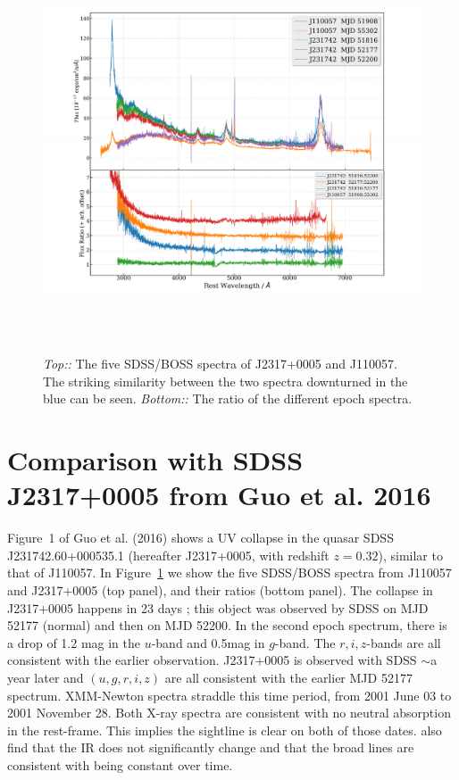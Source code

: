 \documentclass[11pt,a4paper]{article}
\begin{document}
\begin{figure}[h]
  \centering
  \includegraphics[width=16.00cm, height=12.0cm, trim=0.3cm 0.0cm 2.0cm 0.0cm, clip]
  {../plots/spectra/J110057_vs_Guo_both_20171115.pdf}
  \caption[]{ {\it Top::} The five SDSS/BOSS spectra of J2317+0005 and
    J110057.  The striking similarity between the two spectra downturned in
    the blue can be seen.  {\it Bottom::} The ratio of the different epoch
    spectra.}
  \label{fig:J110057_vs_Guo}
\end{figure}
\section*{Comparison with SDSS J2317+0005 from Guo et al. 2016}
Figure~1 of Guo et al. (2016) shows a UV collapse in the quasar SDSS
J231742.60+000535.1 (hereafter J2317+0005, with redshift $z=0.32$),
similar to that of J110057. In Figure~\ref{fig:J110057_vs_Guo} we show
the five SDSS/BOSS spectra from J110057 and J2317+0005 (top panel),
and their ratios (bottom panel).  The collapse in J2317+0005 happens
in 23 days \citep[Figure 2 of ][]{Guo2016}; this object was observed
by SDSS on MJD 52177 (normal) and then on MJD 52200. In the second
epoch spectrum, there is a drop of 1.2 mag in the $u$-band and 0.5mag
in $g$-band. The $r,i,z$-bands are all consistent with the earlier
observation. J2317+0005 is observed with SDSS $\sim$a year later and
$(u,g,r,i,z)$ are all consistent with the earlier MJD 52177
spectrum. XMM-Newton spectra straddle this time period, from 2001 June
03 to 2001 November 28. Both X-ray spectra are consistent with no neutral
absorption in the rest-frame. This implies the sightline is clear on
both of those dates.  \citet{Guo2016} also find that the IR does not
significantly change and that the broad lines are consistent with
being constant over time.
\end{document}
